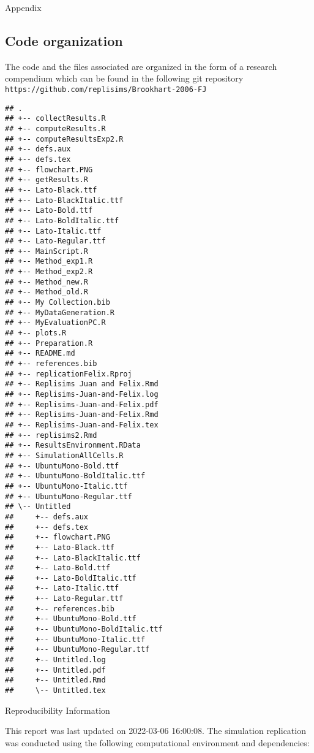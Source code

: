 \documentclass[10,a4paperpaper,]{article}
\begin{document}
\FloatBarrier
\endgroup
\newpage

Appendix

\subsection{Code organization}

The code and the files associated are organized in the form of a
research compendium which can be found in the following git repository
\texttt{https://github.com/replisims/Brookhart-2006-FJ}

\begin{verbatim}
## .
## +-- collectResults.R
## +-- computeResults.R
## +-- computeResultsExp2.R
## +-- defs.aux
## +-- defs.tex
## +-- flowchart.PNG
## +-- getResults.R
## +-- Lato-Black.ttf
## +-- Lato-BlackItalic.ttf
## +-- Lato-Bold.ttf
## +-- Lato-BoldItalic.ttf
## +-- Lato-Italic.ttf
## +-- Lato-Regular.ttf
## +-- MainScript.R
## +-- Method_exp1.R
## +-- Method_exp2.R
## +-- Method_new.R
## +-- Method_old.R
## +-- My Collection.bib
## +-- MyDataGeneration.R
## +-- MyEvaluationPC.R
## +-- plots.R
## +-- Preparation.R
## +-- README.md
## +-- references.bib
## +-- replicationFelix.Rproj
## +-- Replisims Juan and Felix.Rmd
## +-- Replisims-Juan-and-Felix.log
## +-- Replisims-Juan-and-Felix.pdf
## +-- Replisims-Juan-and-Felix.Rmd
## +-- Replisims-Juan-and-Felix.tex
## +-- replisims2.Rmd
## +-- ResultsEnvironment.RData
## +-- SimulationAllCells.R
## +-- UbuntuMono-Bold.ttf
## +-- UbuntuMono-BoldItalic.ttf
## +-- UbuntuMono-Italic.ttf
## +-- UbuntuMono-Regular.ttf
## \-- Untitled
##     +-- defs.aux
##     +-- defs.tex
##     +-- flowchart.PNG
##     +-- Lato-Black.ttf
##     +-- Lato-BlackItalic.ttf
##     +-- Lato-Bold.ttf
##     +-- Lato-BoldItalic.ttf
##     +-- Lato-Italic.ttf
##     +-- Lato-Regular.ttf
##     +-- references.bib
##     +-- UbuntuMono-Bold.ttf
##     +-- UbuntuMono-BoldItalic.ttf
##     +-- UbuntuMono-Italic.ttf
##     +-- UbuntuMono-Regular.ttf
##     +-- Untitled.log
##     +-- Untitled.pdf
##     +-- Untitled.Rmd
##     \-- Untitled.tex
\end{verbatim}


Reproducibility Information

This report was last updated on 2022-03-06 16:00:08. The simulation
replication was conducted using the following computational environment
and dependencies:

\FloatBarrier
\end{document}
